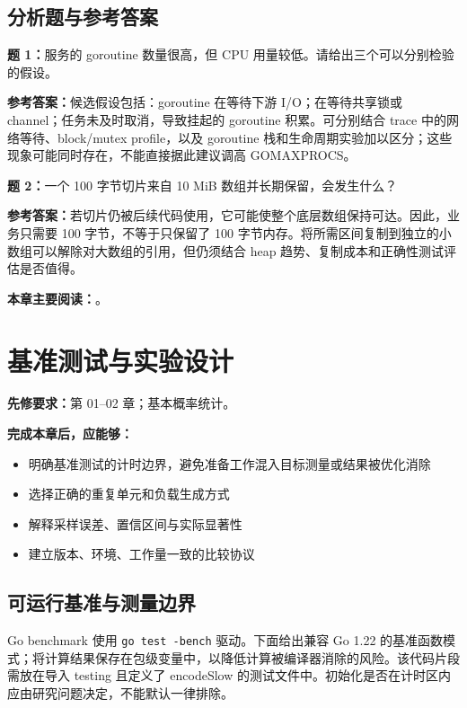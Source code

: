 \documentclass[UTF8,fontset=fandol,openany,11pt]{ctexbook}
\begin{document}
\section{分析题与参考答案}
\noindent\textbf{题 1：}服务的 goroutine 数量很高，但 CPU 用量较低。请给出三个可以分别检验的假设。

\noindent\textbf{参考答案：}候选假设包括：goroutine 在等待下游 I/O；在等待共享锁或 channel；任务未及时取消，导致挂起的 goroutine 积累。可分别结合 trace 中的网络等待、block/mutex profile，以及 goroutine 栈和生命周期实验加以区分；这些现象可能同时存在，不能直接据此建议调高 GOMAXPROCS。

\noindent\textbf{题 2：}一个 100 字节切片来自 10 MiB 数组并长期保留，会发生什么？

\noindent\textbf{参考答案：}若切片仍被后续代码使用，它可能使整个底层数组保持可达。因此，业务只需要 100 字节，不等于只保留了 100 字节内存。将所需区间复制到独立的小数组可以解除对大数组的引用，但仍须结合 heap 趋势、复制成本和正确性测试评估是否值得。

\medskip\noindent\textbf{本章主要阅读：}\cite{go-scheduler}\cite{go-memory}\cite{go-model}\cite{go-race}\cite{tools-go125}。
\chapter{基准测试与实验设计}
\label{ch:03}
\par\medskip
\noindent\textbf{先修要求：}第 01–02 章；基本概率统计。

\noindent\textbf{完成本章后，应能够：}
\begin{itemize}
\item 明确基准测试的计时边界，避免准备工作混入目标测量或结果被优化消除
\item 选择正确的重复单元和负载生成方式
\item 解释采样误差、置信区间与实际显著性
\item 建立版本、环境、工作量一致的比较协议
\end{itemize}
\section{可运行基准与测量边界}
Go benchmark 使用 \texttt{go test -\allowbreak{}bench} 驱动。下面给出兼容 Go 1.22 的基准函数模式；将计算结果保存在包级变量中，以降低计算被编译器消除的风险。该代码片段需放在导入 testing 且定义了 encodeSlow 的测试文件中。初始化是否在计时区内应由研究问题决定，不能默认一律排除。\cite{go-testing}
\end{document}
